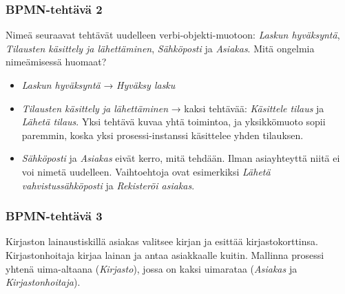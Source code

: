 \documentclass[
  finnish,
  letterpaper,
  DIV=11,
  numbers=noendperiod,
  oneside]{scrreprt}
\providecommand{\tightlist}{%
  \setlength{\itemsep}{0pt}\setlength{\parskip}{0pt}}
\begin{document}
\subsubsection{BPMN-tehtävä 2}\label{bpmn-tehtuxe4vuxe4-2}

Nimeä seuraavat tehtävät uudelleen verbi-objekti-muotoon: \emph{Laskun
hyväksyntä}, \emph{Tilausten käsittely ja lähettäminen},
\emph{Sähköposti} ja \emph{Asiakas}. Mitä ongelmia nimeämisessä huomaat?

\begin{tcolorbox}[enhanced jigsaw, arc=.35mm, bottomrule=.15mm, bottomtitle=1mm, breakable, colback=white, colbacktitle=quarto-callout-tip-color!10!white, colframe=quarto-callout-tip-color-frame, coltitle=black, left=2mm, leftrule=.75mm, opacityback=0, opacitybacktitle=0.6, rightrule=.15mm, title=\textcolor{quarto-callout-tip-color}{\faLightbulb}\hspace{0.5em}{Malliratkaisu}, titlerule=0mm, toprule=.15mm, toptitle=1mm]

\begin{itemize}
\tightlist
\item
  \emph{Laskun hyväksyntä} → \emph{Hyväksy lasku}
\item
  \emph{Tilausten käsittely ja lähettäminen} → kaksi tehtävää:
  \emph{Käsittele tilaus} ja \emph{Lähetä tilaus}. Yksi tehtävä kuvaa
  yhtä toimintoa, ja yksikkömuoto sopii paremmin, koska yksi
  prosessi-instanssi käsittelee yhden tilauksen.
\item
  \emph{Sähköposti} ja \emph{Asiakas} eivät kerro, mitä tehdään. Ilman
  asiayhteyttä niitä ei voi nimetä uudelleen. Vaihtoehtoja ovat
  esimerkiksi \emph{Lähetä vahvistussähköposti} ja \emph{Rekisteröi
  asiakas}.
\end{itemize}

\end{tcolorbox}

\subsubsection{BPMN-tehtävä 3}\label{bpmn-tehtuxe4vuxe4-3}

Kirjaston lainaustiskillä asiakas valitsee kirjan ja esittää
kirjastokorttinsa. Kirjastonhoitaja kirjaa lainan ja antaa asiakkaalle
kuitin. Mallinna prosessi yhtenä uima-altaana (\emph{Kirjasto}), jossa
on kaksi uimarataa (\emph{Asiakas} ja \emph{Kirjastonhoitaja}).
\end{document}
